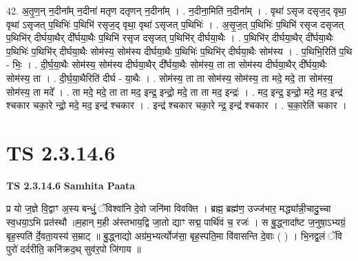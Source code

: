 \documentclass[17pt]{extarticle}
\begin{document}
42. अ॒तृ॒ण॒न् न॒दीना᳚म् न॒दीना॑ मतृण दतृणन् न॒दीना᳚म् । . न॒दीना॒मिति॑ न॒दीना᳚म् । . वृथा॑ ऽसृज दसृज॒द् वृथा॒ वृथा॑ ऽसृजत् प॒थिभिः॑ प॒थिभि॑ रसृज॒द् वृथा॒ वृथा॑ ऽसृजत् प॒थिभिः॑ । . अ॒सृ॒ज॒त् प॒थिभिः॑ प॒थिभि॑ रसृज दसृजत् प॒थिभि॑र् दीर्घया॒थैर् दी᳚र्घया॒थैः प॒थिभि॑ रसृज दसृजत् प॒थिभि॑र् दीर्घया॒थैः । . प॒थिभि॑र् दीर्घया॒थैर् दी᳚र्घया॒थैः प॒थिभिः॑ प॒थिभि॑र् दीर्घया॒थैः सोम॑स्य॒ सोम॑स्य दीर्घया॒थैः प॒थिभिः॑ प॒थिभि॑र् दीर्घया॒थैः सोम॑स्य । . प॒थिभि॒रिति॑ प॒थि - भिः॒ । . दी॒र्घ॒या॒थैः सोम॑स्य॒ सोम॑स्य दीर्घया॒थैर् दी᳚र्घया॒थैः सोम॑स्य॒ ता ता सोम॑स्य दीर्घया॒थैर् दी᳚र्घया॒थैः सोम॑स्य॒ ता । . दी॒र्घ॒या॒थैरिति॑ दीर्घ - या॒थैः । . सोम॑स्य॒ ता ता सोम॑स्य॒ सोम॑स्य॒ ता मदे॒ मदे॒ ता सोम॑स्य॒ सोम॑स्य॒ ता मदे᳚ । . ता मदे॒ मदे॒ ता ता मद॒ इन्द्र॒ इन्द्रो॒ मदे॒ ता ता मद॒ इन्द्रः॑ । . मद॒ इन्द्र॒ इन्द्रो॒ मदे॒ मद॒ इन्द्र॑ श्चकार चका॒रे न्द्रो॒ मदे॒ मद॒ इन्द्र॑ श्चकार । . इन्द्र॑ श्चकार चका॒रे न्द्र॒ इन्द्र॑ श्चकार । . च॒का॒रेति॑ चकार । \newline
\pagebreak
{}

\section{ TS 2.3.14.6 }

\textbf{TS 2.3.14.6 } \newline
\textbf{Samhita Paata} \newline

प्र यो ज॒ज्ञे वि॒द्वाꣳ अ॒स्य बन्धुं॒ ॅविश्वा॑नि दे॒वो जनि॑मा विवक्ति । ब्रह्म॒ ब्रह्म॑ण॒ उज्ज॑भार॒ मद्ध्या᳚न्नी॒चादु॒च्चा स्व॒धया॒ऽभि प्रत॑स्थौ ॥म॒हान् म॒ही अ॑स्तभाय॒द्वि जा॒तो द्याꣳ सद्म॒ पार्थि॑वं च॒ रजः॑ । स बु॒द्ध्नादा᳚ष्ट ज॒नुषा॒ऽभ्यग्रं॒ बृह॒स्पति॑ र्दे॒वता॒यस्य॑ स॒म्राट् ॥ बु॒द्ध्नाद्यो अग्र॑म॒भ्यर्त्योज॑सा॒ बृह॒स्पति॒मा वि॑वासन्ति दे॒वाः ( ) । भि॒नद्व॒लं ॅवि पुरो॑ दर्दरीति॒ कनि॑क्रद॒थ् सुव॑र॒पो जि॑गाय ॥ \newline
\end{document}
